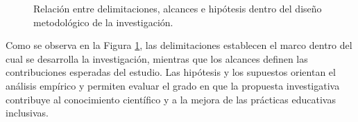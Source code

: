 \begin{refsection}
\begin{figure}[htbp]
{
}

\caption{Relación entre delimitaciones, alcances e hipótesis dentro del diseño metodológico de la investigación.}
\label{fig:coherencia-investigacion}
\end{figure}

Como se observa en la Figura \ref{fig:coherencia-investigacion}, las delimitaciones establecen el marco dentro del cual se desarrolla la investigación, mientras que los alcances definen las contribuciones esperadas del estudio. Las hipótesis y los supuestos orientan el análisis empírico y permiten evaluar el grado en que la propuesta investigativa contribuye al conocimiento científico y a la mejora de las prácticas educativas inclusivas.

\printbibliography[heading=subbibliography,title={Referencias (Capítulo IV)}]

\end{refsection}